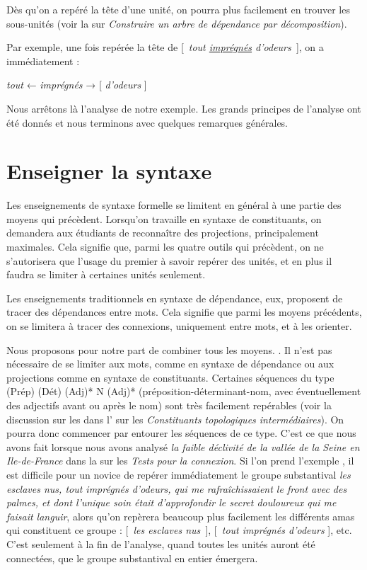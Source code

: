 \begin{tblsframed}{}
\noindent Dès qu’on a repéré la tête d’une unité, on pourra plus facilement en trouver les sous-unités (voir la  sur \textit{Construire un arbre de dépendance par décomposition}).
\end{tblsframed}

Par exemple, une fois repérée la tête de [~\textit{tout \uline{imprégnés} d’odeurs~}], on a immédiatement :

\ea
{\textit{tout}} ← \textit{imprégnés} → [ \textit{d’odeurs} ]
\z

Nous arrêtons là l’analyse de notre exemple. Les grands principes de l’analyse ont été donnés et nous terminons avec quelques remarques générales.

\section{Enseigner la syntaxe}\label{sec:3.4.28}\largerpage

Les enseignements de syntaxe formelle se limitent en général à une partie des moyens qui précèdent. Lorsqu’on travaille en syntaxe de constituants, on demandera aux étudiants de reconnaître des projections, principalement maximales. Cela signifie que, parmi les quatre outils qui précèdent, on ne s’autorisera que l’usage du premier à savoir repérer des unités, et en plus il faudra se limiter à certaines unités seulement.

Les enseignements traditionnels en syntaxe de dépendance, eux, proposent de tracer des dépendances entre mots. Cela signifie que parmi les moyens précédents, on se limitera à tracer des connexions, uniquement entre mots, et à les orienter.

Nous proposons pour notre part de combiner tous les moyens. . Il n’est pas nécessaire de se limiter aux mots, comme en syntaxe de dépendance ou aux projections comme en syntaxe de constituants. Certaines séquences du type (Prép) (Dét) (Adj)* N (Adj)* (pré\-po\-si\-tion-dé\-ter\-mi\-nant-nom, avec éventuellement des adjectifs avant ou après le nom) sont très facilement repérables (voir la discussion sur les  dans l' sur les \textit{Constituants topologiques intermédiaires}). On pourra donc commencer par entourer les séquences de ce type. C’est ce que nous avons fait lorsque nous avons analysé \textit{la faible déclivité de la vallée de la Seine en Ile-de-France} dans la  sur les \textit{Tests pour la connexion}. Si l’on prend l'exemple , il est difficile pour un novice de repérer immédiatement le groupe substantival \textit{les esclaves nus, tout imprégnés d’odeurs, qui me rafraîchissaient le front avec des palmes, et dont l’unique soin était d’approfondir le secret douloureux qui me faisait languir}, alors qu’on repèrera beaucoup plus facilement les différents amas qui constituent ce groupe : [~\textit{les esclaves nus~}], [~\textit{tout imprégnés d’odeurs} ], etc. C’est seulement à la fin de l’analyse, quand toutes les unités auront été connectées, que le groupe substantival en entier émergera.

